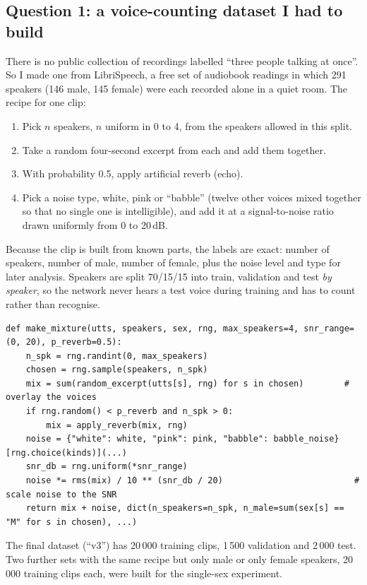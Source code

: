 \documentclass[11pt]{article}
\begin{document}
\subsection{Question 1: a voice-counting dataset I had to build}
There is no public collection of recordings labelled ``three people talking at once''. So I made one from LibriSpeech, a free set of audiobook readings in which 291 speakers (146 male, 145 female) were each recorded alone in a quiet room. The recipe for one clip:
\begin{enumerate}
  \item Pick $n$ speakers, $n$ uniform in 0 to 4, from the speakers allowed in this split.
  \item Take a random four-second excerpt from each and add them together.
  \item With probability 0.5, apply artificial reverb (echo).
  \item Pick a noise type, white, pink or ``babble'' (twelve other voices mixed together so that no single one is intelligible), and add it at a signal-to-noise ratio drawn uniformly from 0 to 20\,dB.
\end{enumerate}
Because the clip is built from known parts, the labels are exact: number of speakers, number of male, number of female, plus the noise level and type for later analysis. Speakers are split 70/15/15 into train, validation and test \emph{by speaker}, so the network never hears a test voice during training and has to count rather than recognise.
\begin{lstlisting}
def make_mixture(utts, speakers, sex, rng, max_speakers=4, snr_range=(0, 20), p_reverb=0.5):
    n_spk = rng.randint(0, max_speakers)
    chosen = rng.sample(speakers, n_spk)
    mix = sum(random_excerpt(utts[s], rng) for s in chosen)        # overlay the voices
    if rng.random() < p_reverb and n_spk > 0:
        mix = apply_reverb(mix, rng)
    noise = {"white": white, "pink": pink, "babble": babble_noise}[rng.choice(kinds)](...)
    snr_db = rng.uniform(*snr_range)
    noise *= rms(mix) / 10 ** (snr_db / 20)                          # scale noise to the SNR
    return mix + noise, dict(n_speakers=n_spk, n_male=sum(sex[s] == "M" for s in chosen), ...)
\end{lstlisting}
The final dataset (``v3'') has 20\,000 training clips, 1\,500 validation and 2\,000 test. Two further sets with the same recipe but only male or only female speakers, 20\,000 training clips each, were built for the single-sex experiment.
\end{document}
